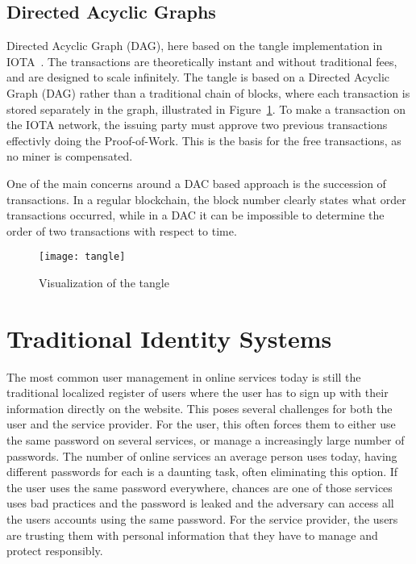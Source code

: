 \subsection{Directed Acyclic Graphs }

Directed Acyclic Graph (DAG), here based on the tangle implementation in IOTA~\cite{IOTA_Whitepaper}. The transactions are theoretically instant and without traditional fees, and are designed to scale infinitely. The tangle is based on a Directed Acyclic Graph (DAG) rather than a traditional chain of blocks, where each transaction is stored separately in the graph, illustrated in Figure~\ref{fig:tangle}. To make a transaction on the IOTA network, the issuing party must approve two previous transactions effectivly doing the Proof-of-Work. This is the basis for the free transactions, as no miner is compensated.

One of the main concerns around a DAC based approach is the succession of transactions. In a regular blockchain, the block number clearly states what order transactions occurred, while in a DAC it can be impossible to determine the order of two transactions with respect to time.

\begin{figure}[ht]
    \centering
    \texttt{[image: tangle]}
    \caption{Visualization of the tangle \cite{IOTA_Whitepaper}}
    \label{fig:tangle}
\end{figure}


\section{Traditional Identity Systems}
The most common user management in online services today is still the traditional localized register of users where the user has to sign up with their information directly on the website. This poses several challenges for both the user and the service provider. For the user, this often forces them to either use the same password on several services, or manage a increasingly large number of passwords. The number of online services an average person uses today, having different passwords for each is a daunting task, often eliminating this option. If the user uses the same password everywhere, chances are one of those services uses bad practices and the password is leaked and the adversary can access all the users accounts using the same password. For the service provider, the users are trusting them with personal information that they have to manage and protect responsibly.

